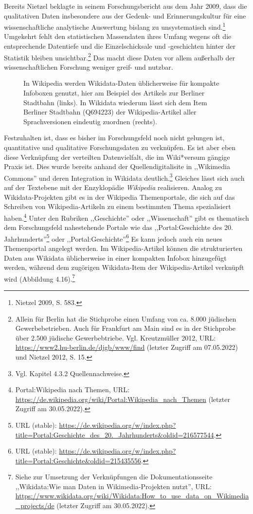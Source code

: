 Bereits Nietzel beklagte in seinem Forschungsbericht aus dem Jahr 2009, dass die qualitativen Daten insbesondere aus der Gedenk- und Erinnerungskultur für eine wissenschaftliche analytische Auswertung bislang zu unsystematisch sind.\footnote{Nietzel 2009, S. 583.} Umgekehrt fehlt den statistischen Massendaten ihres Umfang wegens oft die entsprechende Datentiefe und die Einzelschicksale und -geschichten hinter der Statistik bleiben unsichtbar.\footnote{Allein für Berlin hat die Stichprobe einen Umfang von ca. 8.000 jüdischen Gewerbebetrieben. Auch für Frankfurt am Main sind es in der Stichprobe über 2.500 jüdische Gewerbebtriebe. Vgl. Kreutzmüller 2012, URL: \url{https://www2.hu-berlin.de/djgb/www/find} (letzter Zugriff am 07.05.2022) und Nietzel 2012, S. 15.} Das macht diese Daten vor allem außerhalb der wissenschaftlichen Forschung weniger greif- und nutzbar. 

\begin{figure}[h]
    \centering
    \caption{In Wikipedia werden Wikidata-Daten üblicherweise für kompakte Infoboxen genutzt, hier am Beispiel des Artikels zur Berliner Stadtbahn (links). In Wikidata wiederum lässt sich dem Item Berliner Stadtbahn (Q694223) der Wikipedia-Artikel aller Sprachversionen eindeutig zuordnen (rechts).}
    \label{fig:x cubed graph}
\end{figure}

Festzuhalten ist, dass es bisher im Forschungsfeld noch nicht gelungen ist, quantitative und qualitative Forschungsdaten zu verknüpfen. Es ist aber eben diese Verknüpfung der verteilten Datenvielfalt, die im Wiki*versum gängige Praxis ist. Dies wurde bereits anhand der Quellendigitalisite in ,,Wikimedia Commons'' und deren Integration in Wikidata deutlich.\footnote{Vgl. Kapitel 4.3.2 Quellennachweise.} Gleiches lässt sich auch auf der Textebene mit der Enzyklopädie \textit{Wikipedia} realisieren. Analog zu Wikidata-Projekten gibt es in der Wikipedia Themenportale, die sich auf das Schreiben von Wikipedia-Artikeln zu einem bestimmten Thema spezialisiert haben.\footnote{Portal:Wikipedia nach Themen, URL: \url{https://de.wikipedia.org/wiki/Portal:Wikipedia_nach_Themen} (letzter Zugriff am 30.05.2022).} Unter den Rubriken ,,Geschichte'' oder ,,Wissenschaft'' gibt es thematisch dem Forschungsfeld nahestehende Portale wie das ,,Portal:Geschichte des 20. Jahrhunderts''\footnote{URL (stable): \url{https://de.wikipedia.org/w/index.php?title=Portal:Geschichte\_des\_20.\_Jahrhunderts\&oldid=216577544}.} oder ,,Portal:Geschichte''\footnote{URL (stable): \url{https://de.wikipedia.org/w/index.php?title=Portal:Geschichte\&oldid=215435556}.} Es kann jedoch auch ein neues Themenportal angelegt werden. Im Wikipedia-Artikel können die strukturierten Daten aus Wikidata üblicherweise in einer kompakten Infobox hinzugefügt werden, während dem zugörigen Wikidata-Item der Wikipedia-Artikel verknüpft wird (Abbildung 4.16).\footnote{Siehe zur Umsetzung der Verknüpfungen die Dokumentationsseite ,,Wikidata:Wie man Daten in Wikimedia-Projekten nutzt'', URL: \url{https://www.wikidata.org/wiki/Wikidata:How_to_use_data_on_Wikimedia_projects/de} (letzter Zugriff am 30.05.2022).}

